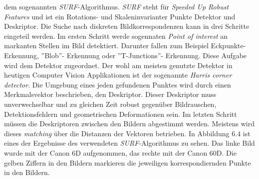 dem sogenannten \textit{SURF}-Algorithmus. \textit{SURF} steht für \textit{Speeded Up Robust Features} und ist ein Rotations- und Skaleninvarianter Punkte Detektor und Deskriptor\cite{SURF}. Die Suche nach diskreten Bildkorrespondenzen kann in drei Schritte eingeteil werden. Im ersten Schritt werde sogennaten \textit{Point of interest} an markanten Stellen im Bild detektiert. Darunter fallen zum Beispiel Eckpunkte-Erkennung, ''Blob''- Erkennung oder  ''T-Junctions''- Erkennung\cite{SURF}. Diese Aufgabe wird dem Detektor zugeordnet. Der wohl am meisten genutzte Detektor in heutigen Computer Vision Applikationen ist der sogenannte \textit{Harris corner detector}\cite{SURF}. Die Umgebung eines jeden gefundenen Punktes wird durch einen Merkmalsvektor beschrieben, den Deskriptor\cite{SURF}. Dieser Deskriptor muss unverwechselbar und zu gleichen Zeit robust  gegenüber Bildrauschen, Detektionsfehlern und geometrischen Deformationen sein. Im letzten Schritt müssen die Deskriptoren zwischen den Bildern abgestimmt werden. Meistens wird dieses \textit{matching} über die Distanzen der Vektoren betrieben. In Abbildung 6.4 ist eines der Ergebnisse des verwendeten \textit{SURF}-Algorithmus zu sehen. Das linke Bild wurde mit der Canon 6D aufgenommen, das rechte mit der Canon 60D. Die gelben Ziffern in den Bildern markieren die jeweiligen korrespondiernden Punkte in den Bildern.\\


